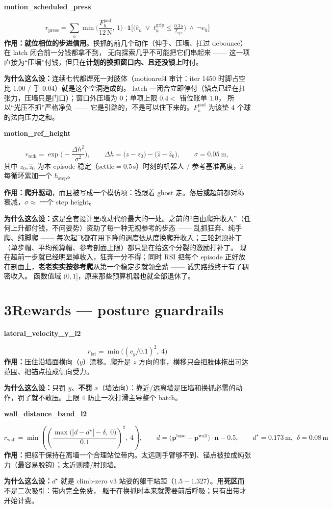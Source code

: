 \documentclass[11pt]{article}
\newcommand{\rterm}[2]{%
  \Needspace*{7\baselineskip}\vspace{7pt}\noindent
  {\bfseries\ttfamily #1}\quad{\color{gray}\bfseries $w=#2$}\par\vspace{-3pt}}
\newcommand{\role}[1]{\noindent\textbf{作用：}#1\par}
\newcommand{\why}[1]{\noindent\textbf{为什么这么设：}#1\par}
\begin{document}
\rterm{motion\_scheduled\_press}{+0.4}
\[
r_{\mathrm{press}} = \sum_{h}
\min\!\Big(\frac{F^{\mathrm{pad}}_h}{12\,\mathrm{N}},\,1\Big)\cdot
\mathbf 1\!\Big[\big(\hat e_h \;\vee\; t^{\mathrm{grip}}_h \le \tfrac{0.3\,\mathrm{s}}{T_{\mathrm{cyc}}}\big)\ \wedge\ \neg e_h\Big]
\]
\role{\textbf{就位相位的步进信用}。换抓的前几个动作（伸手、压墙、扛过 debounce）在 latch 闭合前一分钱都拿不到，
无向探索几乎不可能把它们串起来 —— 这一项直接为“压墙”付钱，但只在\textbf{计划的换抓窗口内、且还没锁上}时付。}
\why{连续七代都焊死一对肢体（motionref4 审计：iter 1450 时脚占空比 1.00 / 手 0.04）就是这个空洞造成的。
latch 一闭合立即停付（锚点已经在扛张力，压墙只是门口）；窗口外压墙为 0；单项上限 $0.4 <$ 错位账单 $1.0$，
所以“光压不抓”严格净负 —— 它是引路的，不是可以住下来的。$F^{\mathrm{pad}}_h$ 为该垫 4 个球的法向压力之和。}

\rterm{motion\_ref\_height}{+2.5}
\[
r_{\mathrm{refh}} = \exp\!\Big(-\frac{\Delta h^2}{\sigma^2}\Big),
\qquad
\Delta h = \big(z - z_0\big) - \big(\hat z - \hat z_0\big),
\qquad \sigma = 0.05\ \mathrm{m},
\]
其中 $z_0,\hat z_0$ 为本 episode 稳定（$\text{settle}=0.5$\,s）时刻的机器人 / 参考基准高度，$\hat z$ 每循环累加一个 $h_{\mathrm{step}}$。

\role{\textbf{爬升驱动}，而且被写成一个模仿项：钱跟着 ghost 走。落后\textbf{或}超前都对称衰减，$\sigma\approx$ 一个 step height。}
\why{这是全套设计里改动代价最大的一处。之前的“自由爬升收入”（任何上升都付钱，不问姿势）资助了每一种无视参考的步态 ——
乱抓狂奔、纯手爬、纯脚爬 —— 每次起飞都在用下降的调度依从度换爬升收入；三轮封顶补丁（单步帽、平均预算帽、参考剖面上限）都只是在给这个分裂的激励打补丁。
现在超前一步就已经明显掉收入，狂奔一分不得；同时 RSI 把每个 episode 正好放在剖面上，\textbf{老老实实按参考爬}从第一个稳定步就领全薪 —— 诚实路线终于有了稠密收入。
函数值域 $(0,1]$，原来那些预算机器也就全部退休了。}

\section*{3\quad Rewards — posture guardrails}

\rterm{lateral\_velocity\_y\_l2}{-0.2}
\[
r_{\mathrm{lat}} = \min\!\big((v_y/0.1)^2,\ 4\big)
\]
\role{压住沿墙面横向（$y$）漂移。爬升是 $z$ 方向的事，横移只会把肢体拖出可达范围、把锚点拉成侧向受力。}
\why{只罚 $y$、\textbf{不罚} $x$（墙法向）：靠近/远离墙是压墙和换抓必需的动作，罚了就不敢压。上限 4 防止一次打滑主导整个 batch。}

\rterm{wall\_distance\_band\_l2}{-0.2}
\[
r_{\mathrm{wall}} = \min\!\left(\left(\frac{\max\big(|d-d^\star| - \delta,\ 0\big)}{0.1}\right)^{2},\ 4\right),
\qquad
d = \big(\bm p^{\mathrm{base}} - \bm p^{\mathrm{wall}}\big)\cdot\bm n - 0.5,
\qquad d^\star = 0.173\,\mathrm{m},\ \ \delta = 0.08\,\mathrm{m}
\]
\role{把躯干保持在离墙一个合理站位带内。太远则手臂够不到、锚点被拉成纯张力（最容易脱钩）；太近则膝/肘顶墙。}
\why{$d^\star$ 就是 climb-zero v3 站姿的躯干站距（$1.5-1.327$）。用\textbf{死区}而不是二次吸引：带内完全免费，
躯干在换抓时本来就需要前后呼吸；只有出带才开始计费。}
\end{document}
